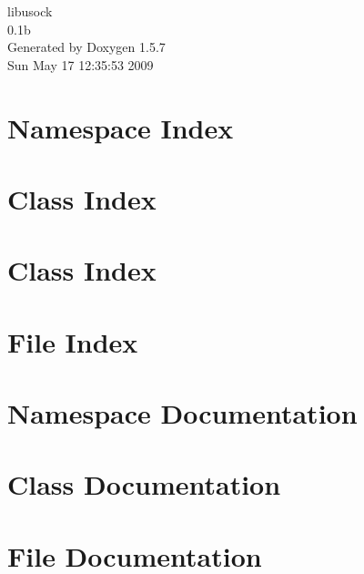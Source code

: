 \documentclass[a4paper]{book}
\begin{document}
\begin{titlepage}
\vspace*{7cm}
\begin{center}
{\Large libusock \\[1ex]\large 0.1b }\\
\vspace*{1cm}
{\large Generated by Doxygen 1.5.7}\\
\vspace*{0.5cm}
{\small Sun May 17 12:35:53 2009}\\
\end{center}
\end{titlepage}
\clearemptydoublepage
{}
\tableofcontents
\clearemptydoublepage
{}
\chapter{Namespace Index}

\chapter{Class Index}

\chapter{Class Index}

\chapter{File Index}

\chapter{Namespace Documentation}

\chapter{Class Documentation}






\chapter{File Documentation}


\printindex
\end{document}
